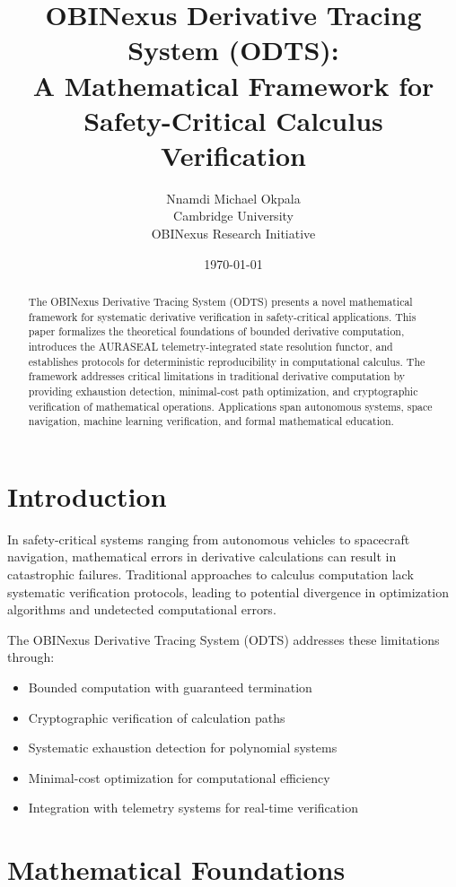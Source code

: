 \documentclass[12pt,a4paper]{article}
\title{OBINexus Derivative Tracing System (ODTS): \\
A Mathematical Framework for Safety-Critical Calculus Verification}
\author{Nnamdi Michael Okpala \\
Cambridge University \\
OBINexus Research Initiative}
\date{\today}
\begin{document}
\maketitle

\begin{abstract}
The OBINexus Derivative Tracing System (ODTS) presents a novel mathematical framework for systematic derivative verification in safety-critical applications. This paper formalizes the theoretical foundations of bounded derivative computation, introduces the AURASEAL telemetry-integrated state resolution functor, and establishes protocols for deterministic reproducibility in computational calculus. The framework addresses critical limitations in traditional derivative computation by providing exhaustion detection, minimal-cost path optimization, and cryptographic verification of mathematical operations. Applications span autonomous systems, space navigation, machine learning verification, and formal mathematical education.
\end{abstract}

\section{Introduction}

In safety-critical systems ranging from autonomous vehicles to spacecraft navigation, mathematical errors in derivative calculations can result in catastrophic failures. Traditional approaches to calculus computation lack systematic verification protocols, leading to potential divergence in optimization algorithms and undetected computational errors.

The OBINexus Derivative Tracing System (ODTS) addresses these limitations through:
\begin{itemize}
\item Bounded computation with guaranteed termination
\item Cryptographic verification of calculation paths  
\item Systematic exhaustion detection for polynomial systems
\item Minimal-cost optimization for computational efficiency
\item Integration with telemetry systems for real-time verification
\end{itemize}

\section{Mathematical Foundations}
\end{document}
